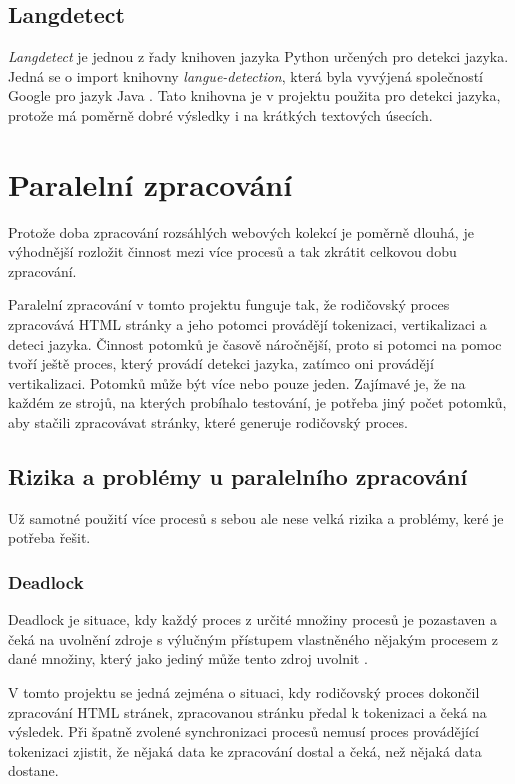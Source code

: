 \subsection{Langdetect}
\label{langdetect}
\textit{Langdetect} je jednou z řady knihoven jazyka Python určených pro detekci jazyka.
Jedná se o import knihovny \textit{langue-detection}, která byla vyvýjená společností Google
pro jazyk Java \cite{LANGDETECT}. Tato knihovna je v projektu použita pro detekci jazyka,
protože má poměrně dobré výsledky i na krátkých textových úsecích.

\section{Paralelní zpracování}
\label{paralel_tokenizer}
Protože doba zpracování rozsáhlých webových kolekcí je poměrně dlouhá, je výhodnější rozložit
činnost mezi více procesů a tak zkrátit celkovou dobu zpracování.

Paralelní zpracování v tomto projektu funguje tak, že rodičovský proces zpracovává HTML
stránky a jeho potomci provádějí tokenizaci, vertikalizaci a deteci jazyka.
Činnost potomků je časově náročnější, proto si potomci na pomoc tvoří ještě proces,
který provádí detekci jazyka, zatímco oni provádějí vertikalizaci.
Potomků může být více nebo pouze jeden. Zajímavé je, že na každém ze strojů, na kterých
probíhalo testování, je potřeba jiný počet potomků, aby stačili zpracovávat stránky, které
generuje rodičovský proces.

\subsection{Rizika a problémy u paralelního zpracování}
Už samotné použití více procesů s sebou ale nese velká rizika a problémy, keré je potřeba řešit.

\subsubsection{Deadlock}
\label{deadlock}
Deadlock je situace, kdy každý proces z určité množiny procesů je pozastaven a čeká na
uvolnění zdroje s výlučným přístupem vlastněného nějakým procesem z dané množiny, který
jako jediný může tento zdroj uvolnit \cite{SYNCPROCES}.

V tomto projektu se jedná zejména o situaci, kdy rodičovský proces dokončil zpracování HTML stránek,
zpracovanou stránku předal k tokenizaci a čeká na výsledek. Při špatně zvolené synchronizaci
procesů nemusí proces provádějící tokenizaci zjistit, že nějaká data ke zpracování dostal
a čeká, než nějaká data dostane.

